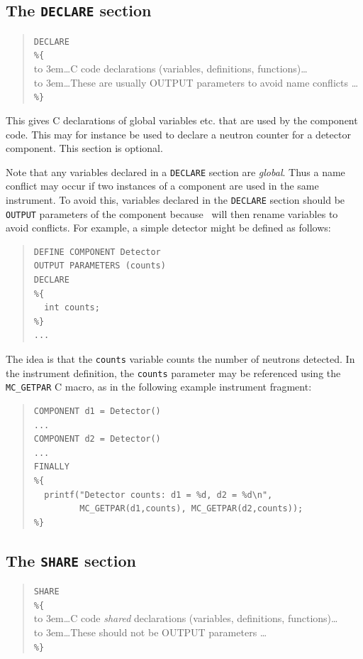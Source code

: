 \subsection{The \texttt{DECLARE} section}
\label{s:comp-declare}
\begin{quote}
  \texttt{DECLARE} \\
  \verb|%{| \\
  \hbox to 3em{}\ldots C code declarations (variables, definitions, functions)\ldots \\
  \hbox to 3em{}\ldots These are usually OUTPUT parameters to avoid name conflicts \ldots \\
  \verb|%}|
\end{quote}
This gives C declarations of global variables etc. that are used by the
component code. This may for instance be used to declare a neutron
counter for a detector component. This section is optional.

Note that any variables declared in a \verb+DECLARE+ section are
\emph{global}. Thus a name conflict may occur if two instances of a
component are used in the same instrument. To avoid this, variables
declared in the \texttt{DECLARE} section should be \texttt{OUTPUT} parameters of
the component because \MCS\ will then rename variables to avoid conflicts. 
For example, a simple detector might be defined as follows:
\begin{quote}
\begin{verbatim}
DEFINE COMPONENT Detector
OUTPUT PARAMETERS (counts)
DECLARE
%{
  int counts;
%}
...
\end{verbatim}
\end{quote}
The idea is that the \texttt{counts} variable counts the number of
neutrons detected. In the instrument definition, the \texttt{counts}
parameter may be referenced using the \verb+MC_GETPAR+ C macro, as in
the following example instrument fragment:\label{mcgetpar}
\begin{quote}
\begin{verbatim}
COMPONENT d1 = Detector()
...
COMPONENT d2 = Detector()
...
FINALLY
%{
  printf("Detector counts: d1 = %d, d2 = %d\n",
         MC_GETPAR(d1,counts), MC_GETPAR(d2,counts));
%}
\end{verbatim}
\end{quote}

\subsection{The \texttt{SHARE} section}
\label{s:comp-share}
\begin{quote}
  \texttt{SHARE} \\
  \verb|%{| \\
  \hbox to 3em{}\ldots C code \emph{shared} declarations (variables, definitions, functions)\ldots \\
  \hbox to 3em{}\ldots These should not be OUTPUT parameters \ldots \\
  \verb|%}|
\end{quote}

